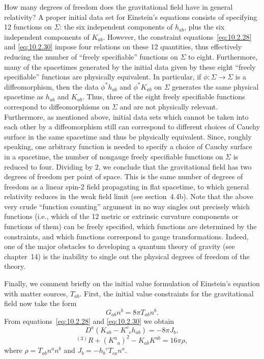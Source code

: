 How many degrees of freedom does the gravitational field have in general relativity?
A proper initial data set for Einstein's equations consists of specifying 12 functions
on \(\Sigma\): the six independent components of \(h_{ab}\), plus the six independent
components of \(K_{ab}\). However, the constraint equations~\eqref{eq:10.2.28} and
\eqref{eq:10.2.30} impose four relations on these 12 quantities, thus effectively
reducing the number of ``freely specifiable'' functions on \(\Sigma\) to eight.
Furthermore, many of the spacetimes generated by the initial data given by these eight
``freely specifiable'' functions are physically equivalent. In particular, if
\(\phi:\Sigma\to\Sigma\) is a diffeomorphism, then the data \(\phi^*h_{ab}\) and
\(\phi^*K_{ab}\) on \(\Sigma\) generates the same physical spacetime as \(h_{ab}\)
and \(K_{ab}\). Thus, three of the eight freely specifiable functions correspond to
diffeomorphisms on \(\Sigma\) and are not physically relevant. Furthermore, as
mentioned above, initial data sets which cannot be taken into each other by a
diffeomorphism still can correspond to different choices of Cauchy surface in the
same spacetime and thus be physically equivalent. Since, roughly speaking, one
arbitrary function is needed to specify a choice of Cauchy surface in a spacetime, the
number of nongauge freely specifiable functions on \(\Sigma\) is reduced to four.
Dividing by 2, we conclude that the gravitational field has two degrees of freedom per
point of space. This is the same number of degrees of freedom as a linear spin-2 field
propagating in flat spacetime, to which general relativity reduces in the weak field
limit (see section~4.4b). Note that the above very crude ``function counting'' argument
in no way singles out precisely which functions (i.e., which of the 12 metric or
extrinsic curvature components or functions of them) can be freely specified, which
functions are determined by the constraints, and which functions correspond to gauge
transformations. Indeed, one of the major obstacles to developing a quantum theory of
gravity (see chapter~14) is the inability to single out the physical degrees of freedom
of the theory.

Finally, we comment briefly on the initial value formulation of Einstein's equation
with matter sources, \(T_{ab}\). First, the initial value constraints for the gravitational
field now take the form
\begin{equation}
  G_{ab}n^b=8\pi T_{ab}n^b.
  \tag{10.2.40}\label{eq:10.2.40}
\end{equation}
From equations~\eqref{eq:10.2.28} and \eqref{eq:10.2.30} we obtain
\begin{equation}
  D^a(K_{ab}-K^c{}_ch_{ab})=-8\pi J_b,
  \tag{10.2.41}\label{eq:10.2.41}
\end{equation}
\begin{equation}
  {}^{(3)}R+(K^a{}_a)^2-K_{ab}K^{ab}=16\pi\rho,
  \tag{10.2.42}\label{eq:10.2.42}
\end{equation}
where \(\rho=T_{ab}n^an^b\) and \(J_b=-h_b{}^cT_{ca}n^a\).


